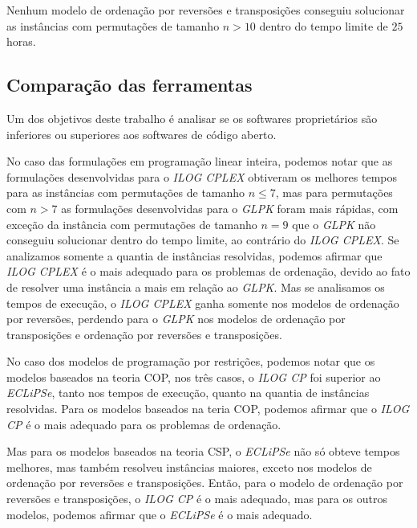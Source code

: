 Nenhum modelo de ordenação por reversões e transposições conseguiu
solucionar as instâncias com permutações de tamanho $n > 10$ dentro do
tempo limite de $25$ horas.



\subsection{Comparação das ferramentas}
\label{subsec:analise_ferramentas}
Um dos objetivos deste trabalho é analisar se os softwares
proprietários são inferiores ou superiores aos softwares de código
aberto.

No caso das formulações em programação linear inteira, podemos notar
que as formulações desenvolvidas para o \textit{ILOG CPLEX} obtiveram
os melhores tempos para as instâncias com permutações de tamanho
$n \le 7$, mas para permutações com $n > 7$ as formulações
desenvolvidas para o \textit{GLPK} foram mais rápidas, com exceção da
instância com permutações de tamanho $n = 9$ que o \textit{GLPK} não
conseguiu solucionar dentro do tempo limite, ao contrário
do \textit{ILOG CPLEX}. Se analizamos somente a quantia de instâncias
resolvidas, podemos afirmar que \textit{ILOG CPLEX} é o mais adequado
para os problemas de ordenação, devido ao fato de resolver uma
instância a mais em relação ao \textit{GLPK}. Mas se analisamos os
tempos de execução, o \textit{ILOG CPLEX} ganha somente nos modelos de
ordenação por reversões, perdendo para o \textit{GLPK} nos modelos de
ordenação por transposições e ordenação por reversões e transposições.

No caso dos modelos de programação por restrições, podemos notar que
os modelos baseados na teoria COP, nos três casos, o \textit{ILOG CP}
foi superior ao \textit{ECLiPSe}, tanto nos tempos de execução, quanto
na quantia de instâncias resolvidas. Para os modelos baseados na teria
COP, podemos afirmar que o \textit{ILOG CP} é o mais adequado para os
problemas de ordenação.

Mas para os modelos baseados na teoria CSP, o \textit{ECLiPSe} não só
obteve tempos melhores, mas também resolveu instâncias maiores, exceto
nos modelos de ordenação por reversões e transposições. Então, para o
modelo de ordenação por reversões e transposições, o \textit{ILOG CP}
é o mais adequado, mas para os outros modelos, podemos afirmar que
o \textit{ECLiPSe} é o mais adequado.
